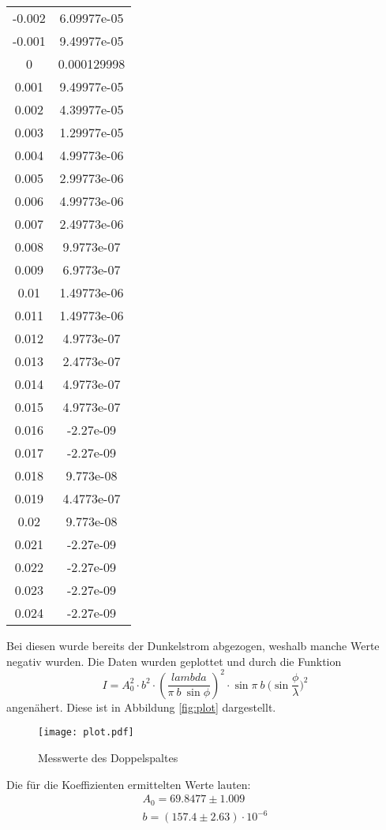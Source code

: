 \begin{table}[H]
\begin{tabular}{c c}
 -0.002       &  6.09977e-05 \\
 -0.001       &  9.49977e-05 \\
  0           &  0.000129998 \\
  0.001       &  9.49977e-05 \\
  0.002       &  4.39977e-05 \\
  0.003       &  1.29977e-05 \\
  0.004       &  4.99773e-06 \\
  0.005       &  2.99773e-06 \\
  0.006       &  4.99773e-06 \\
  0.007       &  2.49773e-06 \\
  0.008       &  9.9773e-07  \\
  0.009       &  6.9773e-07  \\
  0.01        &  1.49773e-06 \\
  0.011       &  1.49773e-06 \\
  0.012       &  4.9773e-07  \\
  0.013       &  2.4773e-07  \\
  0.014       &  4.9773e-07  \\
  0.015       &  4.9773e-07  \\
  0.016       & -2.27e-09    \\
  0.017       & -2.27e-09    \\
  0.018       &  9.773e-08   \\
  0.019       &  4.4773e-07  \\
  0.02        &  9.773e-08   \\
  0.021       & -2.27e-09    \\
  0.022       & -2.27e-09    \\
  0.023       & -2.27e-09    \\
  0.024       & -2.27e-09    \\
   \bottomrule
  \end{tabular}
 \end{table} 
  Bei diesen wurde bereits der Dunkelstrom abgezogen, weshalb manche Werte negativ wurden.
  Die Daten wurden geplottet und durch die Funktion 
  \begin{equation*}
    I=A_0^2\cdot b^2\cdot (\dfrac{lambda}{\pi \ b \ \sin{\phi}})^2 \cdot \sin{\pi \ b \ (\sin{\dfrac{\phi}{\lambda}}})^2
  \end{equation*}
  angenähert. Diese ist in Abbildung \ref{fig:plot} dargestellt.
  \begin{figure}
    \centering
    \texttt{[image: plot.pdf]}
    \caption{Messwerte des Doppelspaltes}
    \label{fig:doppel}
  \end{figure}
  Die für die Koeffizienten ermittelten Werte lauten:
  \begin{align*}
    A_0 = 69.8477 \pm 1.009\\
    b = (157.4 \pm 2.63) \cdot 10^{-6}
  \end{align*}
  

